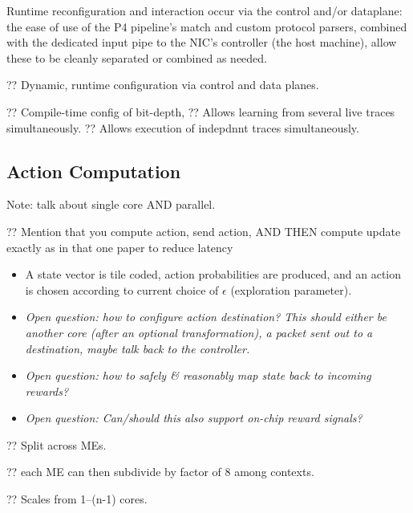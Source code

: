 \documentclass[sigconf,natbib=false]{acmart}
\begin{document}
Runtime reconfiguration and interaction occur via the control and/or dataplane: the ease of use of the P4 pipeline's match and custom protocol parsers, combined with the dedicated input pipe to the NIC's controller (the host machine), allow these to be cleanly separated or combined as needed.


?? Dynamic, runtime configuration via control and data planes.

?? Compile-time config of bit-depth, 
?? Allows learning from several live traces simultaneously.
?? Allows execution of indepdnnt traces simultaneously.

\subsection{Action Computation}
Note: talk about single core AND parallel.

?? Mention that you compute action, send action, AND THEN compute update exactly as in that one paper to reduce latency

\begin{itemize}
	\item A state vector is tile coded, action probabilities are produced, and an action is chosen according to current choice of $\epsilon$ (exploration parameter).
	\item \emph{Open question: how to configure action destination? This should either be another core (after an optional transformation), a packet sent out to a destination, maybe talk back to the controller.}
\end{itemize}
\begin{itemize}
	\item \emph{Open question: how to safely \& reasonably map state back to incoming rewards?}
	\item \emph{Open question: Can/should this also support on-chip reward signals?}
\end{itemize}

?? Split across MEs.

?? each ME can then subdivide by factor of 8 among contexts.

?? Scales from 1--(n-1) cores.
\end{document}
